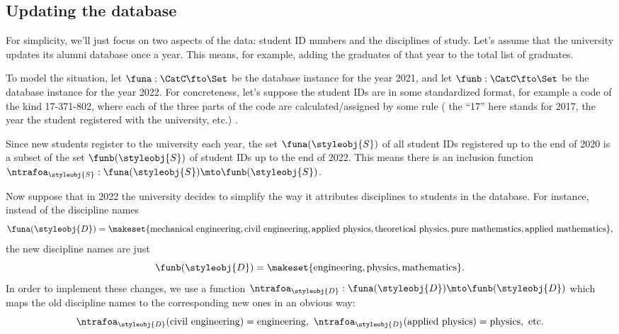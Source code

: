 \subsection{Updating the database}

For simplicity, we'll just focus on two aspects of the data: student ID numbers and the disciplines of study.
Let's assume that the university updates its alumni database once a year.
This means, for example, adding the graduates of that year to the total list of graduates.

To model the situation, let $\funa : \CatC \fto \Set$ be the database instance for the year 2021, and let $\funb : \CatC \fto \Set$ be the database instance for the year 2022.
For concreteness, let's suppose the student IDs are in some standardized format, for example a code of the kind 17-371-802, where each of the three parts of the code are calculated/assigned by some rule ( the ``17'' here stands for 2017, the year the student registered with the university, etc.)
.

Since new students register to the university each year, the set $\funa(\styleobj{S})$ of all student IDs registered up to the end of 2020 is a subset of the set $\funb(\styleobj{S})$ of student IDs up to the end of 2022.
This means there is an inclusion function $\ntrafoa_{\styleobj{S}} :  \funa(\styleobj{S}) \mto \funb(\styleobj{S})$.

Now suppose that in 2022 the university decides to simplify the way it attributes disciplines to students in the database.
For instance, instead of the discipline names
\begin{equation}
    \funa(\styleobj{D}) = \makeset{ \text{mechanical engineering},  \text{civil engineering}, \text{applied physics}, \text{theoretical physics}, \text{pure mathematics}, \text{applied mathematics} },
\end{equation}
the new discipline names are just
\begin{equation}
    \funb(\styleobj{D}) = \makeset{ \text{engineering}, \text{physics}, \text{mathematics} }.
\end{equation}
In order to implement these changes, we use a function $\ntrafoa_{\styleobj{D}}: \funa(\styleobj{D}) \mto \funb(\styleobj{D})$ which maps the old discipline names to the corresponding new ones in an obvious way:
\begin{equation*}
    \ntrafoa_{\styleobj{D}}(\text{civil engineering}) = \text{engineering}, \ \ntrafoa_{\styleobj{D}}(\text{applied physics}) = \text{physics}, \ \text{etc.}
\end{equation*}

